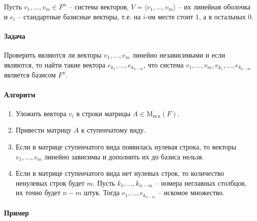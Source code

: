 \documentclass{article}
\newcommand{\MatrixDim}[3]{\operatorname{\mathrm{M}_{#2\,#3}}(#1)}
\begin{document}
Пусть $v_1,\ldots,v_m\in F^{n}$ -- система векторов, $V = \langle v_1,\ldots,v_m \rangle$ -- их линейная оболочка и $e_i$ -- стандартные базисные векторы, т.е. на $i$-ом месте стоит $1$, а в остальных $0$.

\paragraph{Задача}

Проверить являются ли векторы $v_1, \ldots, v_m$ линейно независимыми и если являются, то найти такие вектора $e_{k_1},\ldots, e_{k_{n-m}}$, что система $v_1,\ldots,v_m,e_{k_1},\ldots,e_{k_{n-m}}$ является базисом $F^{n}$.

\paragraph{Алгоритм}

\begin{enumerate}
\item Уложить вектора $v_i$ в строки матрицы $A\in\MatrixDim{F}{m}{n}$.

\item Привести матрицу $A$ к ступенчатому виду.

\item Если в матрице ступенчатого вида появилась нулевая строка, то векторы $v_1,\ldots, v_m$ линейно зависимы и дополнить их до базиса нельзя.

\item Если в матрице ступенчатого вида нет нулевых строк, то количество ненулевых строк будет $m$.
Пусть $k_1,\ldots,k_{n-m}$ -- номера неглавных столбцов, их точно будет $n - m$ штук.
Тогда $e_1,\ldots,e_{k_{n-m}}$ -- искомое множество.
\end{enumerate}

\paragraph{Пример}
\end{document}
